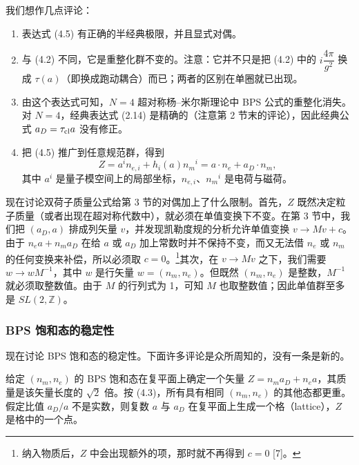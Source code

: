 \documentclass[11pt,a4paper,UTF8,fontset=fandol]{ctexart}
\theoremstyle{plain}
\theoremstyle{definition}
\newcommand{\Z}{\mathbb{Z}}
\newcommand{\Nc}{\mathcal{N}}
\newcommand{\Ff}{\mathcal{F}}
\def\Nc{N}%
\begin{document}
我们想作几点评论：
\begin{enumerate}
\item 表达式 (4.5) 有正确的半经典极限，并且显式对偶。
\item 与 (4.2) 不同，它是重整化群不变的。注意：它并不只是把 (4.2) 中的 $i\dfrac{4\pi}{g^2}$ 换成 $\tau(a)$（即换成跑动耦合）而已；两者的区别在单圈就已出现。
\item 由这个表达式可知，$\Nc=4$ 超对称杨--米尔斯理论中 BPS 公式的重整化消失。对 $\Nc=4$，经典表达式 (2.14) 是精确的（注意第 2 节末的评论），因此经典公式 $a_D=\tau_{\rm cl}a$ 没有修正。
\item 把 (4.5) 推广到任意规范群，得到
\begin{equation}
  Z=a^in_{e,i}+h_i(a)n_m{}^i=a\cdot n_e+a_D\cdot n_m, \tag{4.7}
\end{equation}
其中 $a^i$ 是量子模空间上的局部坐标，$n_{e,i}$、$n_m{}^i$ 是电荷与磁荷。
\end{enumerate}

现在讨论双荷子质量公式给第 3 节的对偶加上了什么限制。首先，$Z$ 既然决定粒子质量（或者出现在超对称代数中），就必须在单值变换下不变。在第 3 节中，我们把 $(a_D,a)$ 排成列矢量 $v$，并发现凯勒度规的分析允许单值变换 $v\to Mv+c$。由于 $n_ea+n_ma_D$ 在给 $a$ 或 $a_D$ 加上常数时并不保持不变，而又无法借 $n_e$ 或 $n_m$ 的任何变换来补偿，所以必须取 $c=0$。\footnote{纳入物质后，$Z$ 中会出现额外的项，那时就不再得到 $c=0$ [7]。}其次，在 $v\to Mv$ 之下，我们需要 $w\to wM^{-1}$，其中 $w$ 是行矢量 $w=(n_m,n_e)$。但既然 $(n_m,n_e)$ 是整数，$M^{-1}$ 就必须取整数值。由于 $M$ 的行列式为 1，可知 $M$ 也取整数值；因此单值群至多是 $SL(2,\Z)$。

\subsubsection*{BPS 饱和态的稳定性}

现在讨论 BPS 饱和态的稳定性。下面许多评论是众所周知的，没有一条是新的。

给定 $(n_m,n_e)$ 的 BPS 饱和态在复平面上确定一个矢量 $Z=n_ma_D+n_ea$，其质量是该矢量长度的 $\sqrt2$ 倍。按 (4.3)，所有具有相同 $(n_m,n_e)$ 的其他态都更重。假定比值 $a_D/a$ 不是实数，则复数 $a$ 与 $a_D$ 在复平面上生成一个格（lattice），$Z$ 是格中的一个点。
\end{document}
